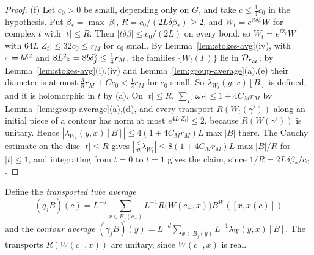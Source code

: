 \begin{proof}
(f) Let $c_0>0$ be small, depending only on $G$, and take $c\le\frac14c_0$ in the hypothesis. Put $\beta_*=\max|\beta|$, $R=c_0/(2L\delta\beta_*)\ge2$, and $W_t=e^{\ii t\delta\beta}W$ for complex $t$ with $|t|\le R$. Then $|t\delta\beta|\le c_0/(2L)$ on every bond, so $W_t=e^{\ii Z_t}W$ with $64L|Z_t|\le32c_0\le r_M$ for $c_0$ small. By Lemma~\ref{lem:stokes-avg}(iv), with $\varepsilon=b\delta^2$ and $8L^2\varepsilon=8b\delta_j^2\le\frac14r_M$, the families $\{W_t(\Gamma)\}$ lie in $\mathcal D_{r_M}$; by Lemma~\ref{lem:stokes-avg}(i),(iv) and Lemma~\ref{lem:group-average}(a),(e) their diameter is at most $\frac38r_M+Cc_0<\frac12r_M$ for $c_0$ small. So $\lambda_{W_t}(y,x)[B]$ is defined, and it is holomorphic in $t$ by (a). On $|t|\le R$, $\sum_\Gamma|\omega_\Gamma|\le1+4C_Mr_M$ by Lemma~\ref{lem:group-average}(a),(d), and every transport $R(W_t(\gamma'))$ along an initial piece of a contour has norm at most $e^{4L|Z_t|}\le2$, because $R(W(\gamma'))$ is unitary. Hence $|\lambda_{W_t}(y,x)[B]|\le4(1+4C_Mr_M)L\max|B|$ there. The Cauchy estimate on the disc $|t|\le R$ gives $|\frac d{dt}\lambda_{W_t}|\le8(1+4C_Mr_M)L\max|B|/R$ for $|t|\le1$, and integrating from $t=0$ to $t=1$ gives the claim, since $1/R=2L\delta\beta_*/c_0$.
\end{proof}

Define the \emph{transported tube average}
\[
(q_jB)(c)=L^{-d}\sum_{x\in B_j(c_-)}L^{-1}R\big(W(c_-,x)\big)B^W([x,x(c)])
\]
\cite[(125)]{BalAvg} and the \emph{contour average} $(\gamma_jB)(y)=L^{-d}\sum_{x\in B_j(y)}L^{-1}\lambda_W(y,x)[B]$. The transports $R(W(c_-,x))$ are unitary, since $W(c_-,x)$ is real.

